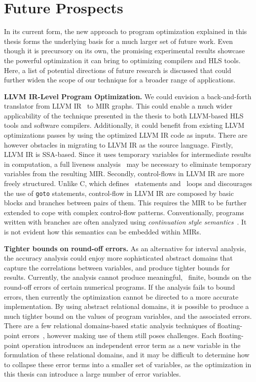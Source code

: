\section{Future Prospects}
\label{sec:future_prospects}

In its current form, the new approach to program optimization explained in this
thesis forms the underlying basis for a much larger set of future work.  Even
though it is precursory on its own, the promising experimental results showcase
the powerful optimization it can bring to optimizing compilers and HLS tools.
Here, a list of potential directions of future research is discussed that could
further widen the scope of our technique for a broader range of applications.

\textbf{LLVM IR-Level Program Optimization.}  We could envision a
back-and-forth translator from LLVM IR~\cite{llvm, llvm_ir} to MIR graphs.
This could enable a much wider applicability of the technique presented in the
thesis to both LLVM-based HLS tools and software compilers.  Additionally,
it could benefit from existing LLVM optimizations passes by using the
optimized LLVM IR code as inputs.  There are however obstacles in migrating
to LLVM IR as the source language.  Firstly, LLVM IR is SSA-based.  Since
it uses temporary variables for intermediate results in computation, a full
liveness analysis~\cite{hathhorn12, nielson99, boissinot08} may be necessary
to eliminate temporary variables from the resulting MIR\@.  Secondly,
control-flows in LLVM IR are more freely structured.  Unlike C, which
defines \iflit~statements and \whilelit~loops and discourages the use of
\verb|goto| statements, control-flow in LLVM IR are composed by basic blocks
and branches between pairs of them.  This requires the MIR to be further
extended to cope with complex control-flow patterns.  Conventionally, programs
written with branches are often analyzed using \emph{continuation style
semantics}~\cite{felleisen88}.  It is not evident how this semantics can be
embedded within MIRs.

\textbf{Tighter bounds on round-off errors.} As an alternative for interval
analysis, the accuracy analysis could enjoy more sophisticated abstract domains
that capture the correlations between variables, and produce tighter bounds
for results.  Currently, the analysis cannot produce meaningful, \ie~finite,
bounds on the round-off errors of certain numerical programs.  If the analysis
fails to bound errors, then currently the optimization cannot be directed
to a more accurate implementation.  By using abstract relational domains,
it is possible to produce a much tighter bound on the values of program
variables, and the associated errors.  There are a few relational domains-based
static analysis techniques of floating-point errors~\cite{mine07_2, putot04,
goubault11, astree}, however making use of them still poses challenges.  Each
floating-point operation introduces an independent error term as a new variable
in the formulation of these relational domains, and it may be difficult to
determine how to collapse these error terms into a smaller set of variables,
as the optimization in this thesis can introduce a large number of error
variables.

